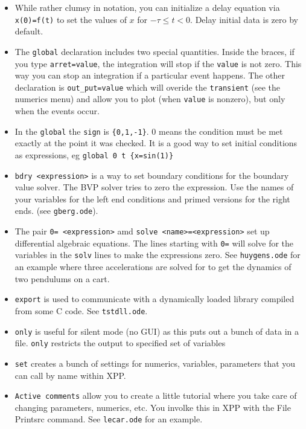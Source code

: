 \begin{itemize}
\item While rather clumsy in notation, you can initialize a delay equation via {\tt x(0)=f(t)} to set the values of $x$ for $-\tau\le t<0.$ Delay initial data is zero by default.  
\item The {\tt global} declaration includes two special quantities. Inside the braces, if you type {\tt arret=value}, the integration will stop if the {\tt value} is not zero. This way you can stop an integration if a particular event happens. The other declaration is {\tt out\_put=value} which will overide the {\tt transient} (see the numerics menu)  and allow you to plot (when {\tt value} is nonzero), but only when the events occur.  
\item In the {\tt global} the {\tt sign} is {\tt \{0,1,-1\}}. 0 means the condition must be met exactly at the point it was checked. It is a good way to set initial conditions as expressions, eg {\tt global 0 t \{x=sin(1)\} }
\item {\tt bdry <expression>} is a way to set boundary conditions for the boundary value solver. The BVP solver tries to zero the expression. Use the names of your variables for the left end conditions and primed versions for the right ends. (see {\tt gberg.ode}). 
\item The pair {\tt 0= <expression>} amd {\tt solve <name>=<expression>} set up differential algebraic equations. The lines starting with {\tt 0=} will solve for the variables in the {\tt solv} lines to make the expressions zero. See {\tt huygens.ode} for an example where three accelerations are solved for to get the dynamics of two pendulums on a cart.
\item {\tt export} is used to communicate with a dynamically loaded library compiled from some C code.  See {\tt tstdll.ode}.
\item {\tt only} is useful for silent mode (no GUI) as this puts out a bunch of data in a file. {\tt only} restricts the output to specified set of variables
\item {\tt set} creates a bunch of settings for numerics, variables, parameters that you can call by name within XPP.
\item {\tt Active comments} allow you to create a little tutorial where you take care of changing parameters, numerics, etc. You involke this in XPP with the File Printsrc command. See {\tt lecar.ode} for an example.

\end{itemize}
 
